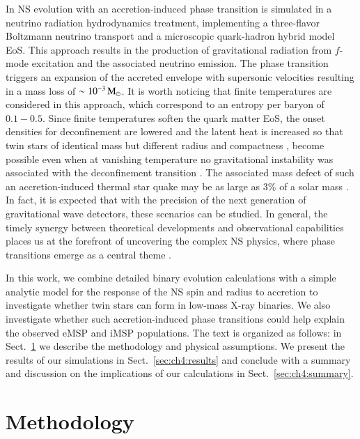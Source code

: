 \documentclass[main.tex]{subfiles}
\begin{document}
    In \cite{2023arXiv231115992K} NS evolution with an accretion-induced phase transition is simulated in a neutrino radiation hydrodynamics treatment,
    implementing a three-flavor Boltzmann neutrino transport and a microscopic quark-hadron hybrid model EoS. 
    This approach results in the production of gravitational radiation from $f$-mode excitation and the associated neutrino emission. 
    The phase transition triggers an expansion of the accreted envelope with supersonic velocities resulting in a mass loss of $\sim 10^{-3}\mathrm{\,M_\odot}$. 
    It is worth noticing that finite temperatures are considered in this approach, which correspond to an entropy per baryon of $0.1-0.5$. 
    Since finite temperatures soften the quark matter EoS, the onset densities for deconfinement are lowered and the latent heat is increased so that twin stars of identical mass but different radius and compactness \citep{Gerlach:1968zz, Schertler:2000xq}, become possible even when at vanishing temperature no gravitational instability was associated with the deconfinement transition \citep{Hempel:2015vlg,Carlomagno:2023nrc}. 
    The associated mass defect of such an accretion-induced thermal star quake may be as large as $3\%$ of a solar mass \citep{Carlomagno:2024vvr}.
    In fact, it is expected that with the precision of the next generation of gravitational wave detectors, these scenarios can be studied. 
    In general, the timely synergy between theoretical developments and observational capabilities places us at the forefront of uncovering the complex NS physics, where phase transitions emerge as a central theme \citep{Bauswein:2022vtq}.
    
    In this work, we combine detailed binary evolution calculations with a simple analytic model for the response of the NS spin and radius to accretion to investigate whether twin stars can form in low-mass X-ray binaries. We also investigate whether such accretion-induced phase transitions could help explain the observed eMSP and iMSP populations. The text is organized as follows: in Sect.~\ref{sec:ch4:methods} we describe the methodology and physical assumptions. We present the results of our simulations in Sect.~\ref{sec:ch4:results} and conclude with a summary and discussion on the implications of our calculations in Sect.~\ref{sec:ch4:summary}.

    \section{Methodology} \label{sec:ch4:methods}
\end{document}

